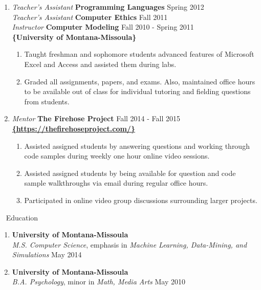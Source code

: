\documentclass[oneside]{article}%
\begin{document}
\begin{enumerate}[]
	\item \textit{Teacher's Assistant} \textbf{Programming Languages} \hfill Spring 2012\\
		\textit{Teacher's Assistant} \textbf{Computer Ethics} \hfill Fall 2011\\
		\textit{Instructor} \textbf{Computer Modeling} \hfill Fall 2010 - Spring 2011\\
		\textbf{\{University of Montana-Missoula\}}
		\begin{enumerate}[*]
			\item Taught freshman and sophomore students advanced features of Microsoft Excel and Access and assisted them during labs.
			\item Graded all assignments, papers, and exams. Also, maintained office hours to be available out of class for individual tutoring and fielding questions from students.
		\end{enumerate}
	\item \textit{Mentor} \textbf{The Firehose Project} \hfill Fall 2014 - Fall 2015\\
		\textbf{\href{https://thefirehoseproject.com/}{\{https://thefirehoseproject.com/\}}}
		\begin{enumerate}[*]
			\item Assisted assigned students by answering questions and working through code samples during weekly one hour online video sessions.
			\item Assisted assigned students by being available for question and code sample walkthroughs via email during regular office hours.
			\item Participated in online video group discussions surrounding larger projects.

		\end{enumerate}
\end{enumerate}
\
\noindent
\huge{Education}
\small
\begin{enumerate}[]
\item \textbf{University of Montana-Missoula}\\
	\textit{M.S. Computer Science}, emphasis in \textit{Machine Learning, Data-Mining, and Simulations} \hfill May 2014
\item \textbf{University of Montana-Missoula}\\
	\textit{B.A. Psychology}, minor in \textit{Math, Media Arts} \hfill May 2010
	\
\end{enumerate}
\end{document}
